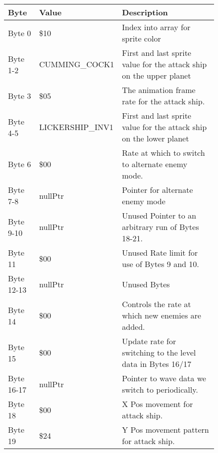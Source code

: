 \begin{figure}[H]
  {
  \setlength{\tabcolsep}{3.0pt}
  \setlength\cmidrulewidth{\heavyrulewidth} %
  \begin{adjustbox}{width=12cm}

\begin{tabular}{lll}
\toprule
 Byte       & Value                    & Description                                                         \\
\midrule
 Byte 0     & \$10                      & Index into array for sprite color                                   \\
 Byte 1-2   & CUMMING\_COCK1            & First and last sprite value for the attack ship on the upper planet \\
 Byte 3     & \$05                      & The animation frame rate for the attack ship.                       \\
 Byte 4-5   & LICKERSHIP\_INV1          & First and last sprite value for the attack ship on the lower planet \\
 Byte 6     & \$00                      & Rate at which to switch to alternate enemy mode.                    \\
 Byte 7-8   & nullPtr                  & Pointer for alternate enemy mode                                    \\
 Byte 9-10  & nullPtr                  & Unused Pointer to an arbitrary run of Bytes 18-21.                  \\
 Byte 11    & \$00                      & Unused Rate limit for use of Bytes 9 and 10.                        \\
 Byte 12-13 & nullPtr                  & Unused Bytes                                                        \\
 Byte 14    & \$00                      & Controls the rate at which new enemies are added.                   \\
 Byte 15    & \$00                      & Update rate for switching to the level data in Bytes 16/17          \\
 Byte 16-17 & nullPtr                  & Pointer to wave data we switch to periodically.                     \\
 Byte 18    & \$00                      & X Pos movement for attack ship.                                     \\
 Byte 19    & \$24                      & Y Pos movement pattern for attack ship.                             \\

\end{tabular}
\end{adjustbox}}
\end{figure}
